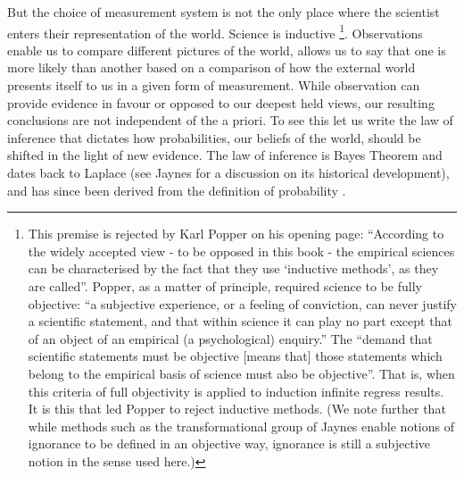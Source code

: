 But the choice of measurement system is not the only place where the scientist enters 
their representation of the world.
Science is inductive%
\footnote{
This premise is  rejected by Karl Popper\cite{Popper2002} on his opening
page:
``According to the widely accepted view - to be opposed in this book - 
the empirical sciences can be characterised by the fact that they use
`inductive methods', as they are called''.
Popper, as a matter of principle, required science to be fully
objective:
``a subjective experience, or a feeling of conviction, can never
justify a scientific statement, and that within science it can play no
part except that of an object of an empirical (a psychological)
enquiry.''
The ``demand that scientific statements must be objective [means that]
those statements which belong to the empirical basis of science must
also be objective''. 
That is, when this criteria of full objectivity is applied to  induction
infinite regress results.  
It is this that led Popper to reject inductive methods.
(We note further that while methods such as the transformational group of 
Jaynes\cite{Jaynes1973a} enable notions of ignorance to be defined in an
objective way, ignorance is still a subjective notion in the sense
used here.)
%
%
%
}.
Observations enable us to compare different pictures of the world,
allows us to say that one is more likely than another
based on a comparison of how the external world presents itself to us in a given form of measurement.
While observation can provide evidence in favour or opposed to our
deepest held views,
our resulting conclusions are  not independent of the a priori.
To see this let us write the law of inference
that dictates how probabilities,
our beliefs of the world,
should be shifted in the light of new evidence.
The law of inference is Bayes Theorem and dates back to 
Laplace (see Jaynes\cite{Jaynes1979} for a discussion on its historical development),
and has since been derived from the definition of probability
\cite{Cox1946, Skilling1991}.

